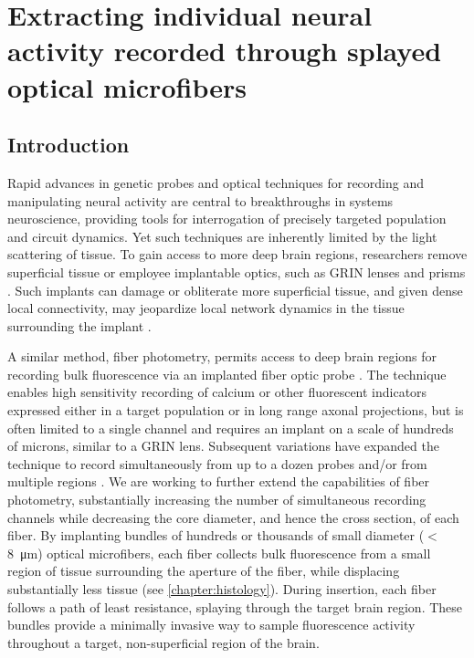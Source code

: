 \chapter{Extracting individual neural activity recorded through splayed optical microfibers}

\label{chapter:modeling}
\thispagestyle{myheadings}

\graphicspath{{4_Modeling/Figures/}}


\section{Introduction}

Rapid advances in genetic probes \cite{Emiliani:2015jl} and optical techniques for recording and manipulating neural activity \cite{Deisseroth:2006dd} are central to breakthroughs in systems neuroscience, providing tools for interrogation of precisely targeted population and circuit dynamics. Yet such techniques are inherently limited by the light scattering of tissue. To gain access to more deep brain regions, researchers remove superficial tissue \cite{Dombeck:2010jr} or employee implantable optics, such as GRIN lenses and prisms \cite{Jung:2004kv,Barretto:2009hk,Andermann:2013kc}. Such implants can damage or obliterate more superficial tissue, and given dense local connectivity, may jeopardize local network dynamics in the tissue surrounding the implant \cite{Hayn:2015ew,Hayn:2017kj,GossVarley:2017kf}.

A similar method, fiber photometry, permits access to deep brain regions for recording bulk fluorescence via an implanted fiber optic probe \cite{Adelsberger:2005dy,Cui:2013dq,Adelsberger:2014jd,Gunaydin:2014dh}. The technique enables high sensitivity recording of calcium or other fluorescent indicators expressed either in a target population or in long range axonal projections, but is often limited to a single channel and requires an implant on a scale of hundreds of microns, similar to a GRIN lens. Subsequent variations have expanded the technique to record simultaneously from up to a dozen probes and/or from multiple regions \cite{Guo:2015gu}. We are working to further extend the capabilities of fiber photometry, substantially increasing the number of simultaneous recording channels while decreasing the core diameter, and hence the cross section, of each fiber. By implanting bundles of hundreds or thousands of small diameter ($<$8~\si{\micro\meter}) optical microfibers, each fiber collects bulk fluorescence from a small region of tissue surrounding the aperture of the fiber, while displacing substantially less tissue (see \cref{chapter:histology}). During insertion, each fiber follows a path of least resistance, splaying through the target brain region. These bundles provide a minimally invasive way to sample fluorescence activity throughout a target, non-superficial region of the brain.

